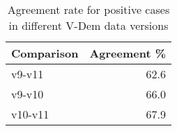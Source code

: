 \begin{table}

\caption{\label{tab:versions-comp}Agreement rate for positive cases in different V-Dem data versions}
\centering
\begin{tabular}[t]{lr}
\toprule
Comparison & Agreement \%\\
\midrule
v9-v11 & 62.6\\
v9-v10 & 66.0\\
v10-v11 & 67.9\\
\bottomrule
\end{tabular}
\end{table}
